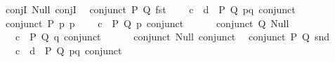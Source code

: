 \begin{isabellebody}
\isanewline
\ \ conjI{\isacharcolon}{\kern0pt}\ {\isachardoublequoteopen}Null{\isachardoublequoteclose}\ {\isachardoublequoteopen}conjI{\isachardoublequoteclose}\isanewline
\isanewline
\ \ conjunct{}\ {\isacharparenleft}{\kern0pt}P{\isacharcomma}{\kern0pt}\ Q{\isacharparenright}{\kern0pt}{\isacharcolon}{\kern0pt}\ {\isachardoublequoteopen}fst{\isachardoublequoteclose}\isanewline
\ \ \ \ {\isachardoublequoteopen}\isactrlbold {\isasymlambda}{\isacharparenleft}{\kern0pt}c{\isacharcolon}{\kern0pt}\ {\isacharunderscore}{\kern0pt}{\isacharparenright}{\kern0pt}\ {\isacharparenleft}{\kern0pt}d{\isacharcolon}{\kern0pt}\ {\isacharunderscore}{\kern0pt}{\isacharparenright}{\kern0pt}\ P\ Q\ pq{\isachardot}{\kern0pt}\ conjunct{}\ {\isasymcdot}\ {\isacharunderscore}{\kern0pt}\ {\isasymcdot}\ {\isacharunderscore}{\kern0pt}{\isachardoublequoteclose}\isanewline
\isanewline
\ \ conjunct{}\ {\isacharparenleft}{\kern0pt}P{\isacharparenright}{\kern0pt}{\isacharcolon}{\kern0pt}\ {\isachardoublequoteopen}{\isasymlambda}p{\isachardot}{\kern0pt}\ p{\isachardoublequoteclose}\isanewline
\ \ \ \ {\isachardoublequoteopen}\isactrlbold {\isasymlambda}{\isacharparenleft}{\kern0pt}c{\isacharcolon}{\kern0pt}\ {\isacharunderscore}{\kern0pt}{\isacharparenright}{\kern0pt}\ P\ Q\ p{\isachardot}{\kern0pt}\ conjunct{}\ {\isasymcdot}\ {\isacharunderscore}{\kern0pt}\ {\isasymcdot}\ {\isacharunderscore}{\kern0pt}{\isachardoublequoteclose}\isanewline
\isanewline
\ \ conjunct{}\ {\isacharparenleft}{\kern0pt}Q{\isacharparenright}{\kern0pt}{\isacharcolon}{\kern0pt}\ {\isachardoublequoteopen}Null{\isachardoublequoteclose}\isanewline
\ \ \ \ {\isachardoublequoteopen}\isactrlbold {\isasymlambda}{\isacharparenleft}{\kern0pt}c{\isacharcolon}{\kern0pt}\ {\isacharunderscore}{\kern0pt}{\isacharparenright}{\kern0pt}\ P\ Q\ q{\isachardot}{\kern0pt}\ conjunct{}\ {\isasymcdot}\ {\isacharunderscore}{\kern0pt}\ {\isasymcdot}\ {\isacharunderscore}{\kern0pt}{\isachardoublequoteclose}\isanewline
\isanewline
\ \ conjunct{}{\isacharcolon}{\kern0pt}\ {\isachardoublequoteopen}Null{\isachardoublequoteclose}\ {\isachardoublequoteopen}conjunct{}{\isachardoublequoteclose}\isanewline
\isanewline
\ \ conjunct{}\ {\isacharparenleft}{\kern0pt}P{\isacharcomma}{\kern0pt}\ Q{\isacharparenright}{\kern0pt}{\isacharcolon}{\kern0pt}\ {\isachardoublequoteopen}snd{\isachardoublequoteclose}\isanewline
\ \ \ \ {\isachardoublequoteopen}\isactrlbold {\isasymlambda}{\isacharparenleft}{\kern0pt}c{\isacharcolon}{\kern0pt}\ {\isacharunderscore}{\kern0pt}{\isacharparenright}{\kern0pt}\ {\isacharparenleft}{\kern0pt}d{\isacharcolon}{\kern0pt}\ {\isacharunderscore}{\kern0pt}{\isacharparenright}{\kern0pt}\ P\ Q\ pq{\isachardot}{\kern0pt}\ conjunct{}\ {\isasymcdot}\ {\isacharunderscore}{\kern0pt}\ {\isasymcdot}\ {\isacharunderscore}{\kern0pt}{\isachardoublequoteclose}\isanewline

\end{isabellebody}
